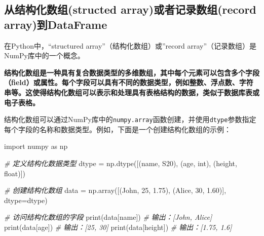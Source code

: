 \documentclass[11pt]{ctexart}
\newenvironment{Shaded}{}{}
\newcommand{\DecValTok}[1]{\textcolor[rgb]{0.25,0.63,0.44}{{#1}}}
\newcommand{\FloatTok}[1]{\textcolor[rgb]{0.25,0.63,0.44}{{#1}}}
\newcommand{\StringTok}[1]{\textcolor[rgb]{0.25,0.44,0.63}{{#1}}}
\newcommand{\CommentTok}[1]{\textcolor[rgb]{0.38,0.63,0.69}{\textit{{#1}}}}
\newcommand{\NormalTok}[1]{{#1}}
\newcommand{\ImportTok}[1]{{#1}}
\newcommand{\OperatorTok}[1]{\textcolor[rgb]{0.40,0.40,0.40}{{#1}}}
\newcommand{\BuiltInTok}[1]{{#1}}
\begin{document}
    \hypertarget{ux4eceux7ed3ux6784ux5316ux6570ux7ec4structed-arrayux6216ux8005ux8bb0ux5f55ux6570ux7ec4record-arrayux5230dataframe}{%
\subsection{从结构化数组(structed array)或者记录数组(record
array)到DataFrame}\label{ux4eceux7ed3ux6784ux5316ux6570ux7ec4structed-arrayux6216ux8005ux8bb0ux5f55ux6570ux7ec4record-arrayux5230dataframe}}

在Python中，``structured array''（结构化数组）或''record
array''（记录数组）是NumPy库中的一个概念。

\textbf{结构化数组是一种具有复合数据类型的多维数组，其中每个元素可以包含多个字段（field）或属性。每个字段可以具有不同的数据类型，例如整数、浮点数、字符串等。这使得结构化数组可以表示和处理具有表格结构的数据，类似于数据库表或电子表格。}

结构化数组可以通过NumPy库中的\texttt{numpy.array}函数创建，并使用\texttt{dtype}参数指定每个字段的名称和数据类型。例如，下面是一个创建结构化数组的示例：

\begin{Shaded}
\begin{Highlighting}[]
\ImportTok{import}\NormalTok{ numpy }\ImportTok{as}\NormalTok{ np}

\CommentTok{\# 定义结构化数据类型}
\NormalTok{dtype }\OperatorTok{=}\NormalTok{ np.dtype([(}\StringTok{\textquotesingle{}name\textquotesingle{}}\NormalTok{, }\StringTok{\textquotesingle{}S20\textquotesingle{}}\NormalTok{), (}\StringTok{\textquotesingle{}age\textquotesingle{}}\NormalTok{, }\BuiltInTok{int}\NormalTok{), (}\StringTok{\textquotesingle{}height\textquotesingle{}}\NormalTok{, }\BuiltInTok{float}\NormalTok{)])}

\CommentTok{\# 创建结构化数组}
\NormalTok{data }\OperatorTok{=}\NormalTok{ np.array([(}\StringTok{\textquotesingle{}John\textquotesingle{}}\NormalTok{, }\DecValTok{25}\NormalTok{, }\FloatTok{1.75}\NormalTok{), (}\StringTok{\textquotesingle{}Alice\textquotesingle{}}\NormalTok{, }\DecValTok{30}\NormalTok{, }\FloatTok{1.60}\NormalTok{)], dtype}\OperatorTok{=}\NormalTok{dtype)}

\CommentTok{\# 访问结构化数组的字段}
\BuiltInTok{print}\NormalTok{(data[}\StringTok{\textquotesingle{}name\textquotesingle{}}\NormalTok{])    }\CommentTok{\# 输出：[\textquotesingle{}John\textquotesingle{}, \textquotesingle{}Alice\textquotesingle{}]}
\BuiltInTok{print}\NormalTok{(data[}\StringTok{\textquotesingle{}age\textquotesingle{}}\NormalTok{])     }\CommentTok{\# 输出：[25, 30]}
\BuiltInTok{print}\NormalTok{(data[}\StringTok{\textquotesingle{}height\textquotesingle{}}\NormalTok{])  }\CommentTok{\# 输出：[1.75, 1.6]}
\end{Highlighting}
\end{Shaded}
\end{document}
